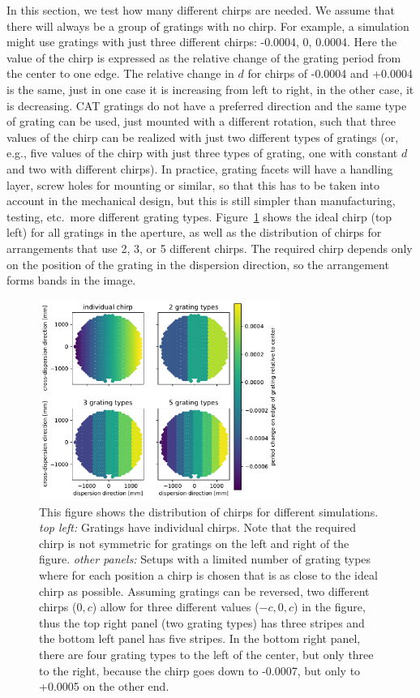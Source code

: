 \documentclass[]{spie}  %
\begin{document}
In this section, we test how many different chirps are needed. We assume that there will always be  a group of gratings with no chirp. For example, a simulation might use gratings with just three different chirps: -0.0004, 0, 0.0004. Here the value of the chirp is expressed as the relative change of the grating period from the center to one edge. The relative change in $d$ for chirps of -0.0004 and +0.0004 is the same, just in one case it is increasing from left to right, in the other case, it is decreasing. CAT gratings do not have a preferred direction and the same type of grating can be used, just mounted with a different rotation, such that three values of the chirp can be realized with just two different types of gratings (or, e.g., five values of the chirp with just three types of grating, one with constant $d$ and two with different chirps). In practice, grating facets will have a handling layer, screw holes for mounting or similar, so that this has to be taken into account in the mechanical design, but this is still simpler than manufacturing, testing, etc.\ more different grating types.
Figure~\ref{fig:chirps_distribution} shows the ideal chirp (top left) for all gratings in the aperture, as well as the distribution of chirps for arrangements that use 2, 3, or 5 different chirps. The required chirp depends only on the position of the grating in the dispersion direction, so the arrangement forms bands in the image. 

\begin{figure} [ht]
\begin{center}
\includegraphics[width=0.7\textwidth]{chirps_distribution}
\end{center}
\caption {\label{fig:chirps_distribution}
This figure shows the distribution of chirps for different simulations. \emph{top left:} Gratings have individual chirps. Note that the required chirp is not symmetric for gratings on the left and right of the figure. \emph{other panels:} Setups with a limited number of grating types where for each position a chirp is chosen that is as close to the ideal chirp as possible. Assuming gratings can be reversed, two different chirps ($0, c$) allow for three different values ($-c, 0, c$) in the figure, thus the top right panel (two grating types) has three stripes and the bottom left panel has five stripes. In the bottom right panel, there are four grating types to the left of the center, but only three to the right, because the chirp goes down to -0.0007, but only to +0.0005 on the other end.}
\end{figure}
\end{document}
